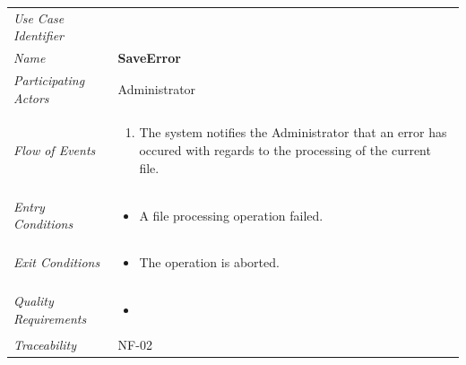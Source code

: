 \documentclass[12pt,letterpaper]{article}
\begin{document}
\begin{center}
	\begin{tabu} to 
		\toprule
		Use Case Identifier & \saveerror{} \\
		Name & {\bf SaveError} \\
		Participating Actors & Administrator \\
		Flow of Events & 
	    \begin{enumerate}[topsep=-1em,leftmargin=*]
		    \item The system notifies the Administrator that an error has occured with regards to the processing of
		    the current file.
		\end{enumerate} \\

		Entry Conditions &
		\begin{itemize}[topsep=-1em,leftmargin=*]
		    \item A file processing operation failed.
        \end{itemize} \\

		Exit Conditions &
		\begin{itemize}[topsep=-1em,leftmargin=*]
		    \item The operation is aborted.
        \end{itemize} \\

		Quality Requirements &
		\begin{itemize}[topsep=-1em,leftmargin=*]
		    \item 
        \end{itemize} \\

		Traceability & NF-02 \\
		\toprule
	\end{tabu}
\end{center}
\end{document}
